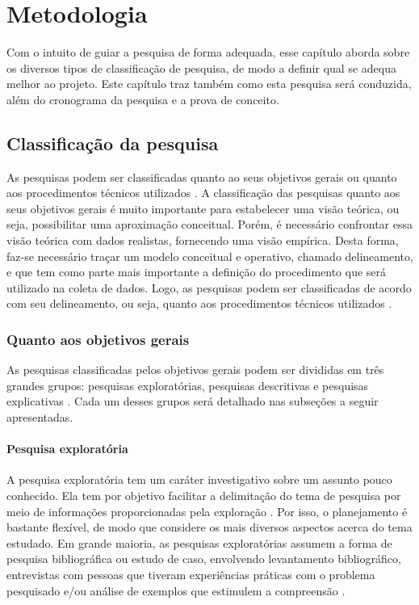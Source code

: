 \chapter{Metodologia}
Com o intuito de guiar a pesquisa de forma adequada, esse capítulo aborda sobre os diversos tipos de classificação de pesquisa, de modo a definir qual se adequa melhor ao projeto. Este capítulo traz também como esta pesquisa será conduzida, além do cronograma da pesquisa e a prova de conceito.

\section{Classificação da pesquisa}
	As pesquisas podem ser classificadas quanto ao seus objetivos gerais ou quanto aos procedimentos técnicos utilizados \cite{ac2002elaborar}. A classificação das pesquisas quanto aos seus objetivos gerais é muito importante para estabelecer uma visão teórica, ou seja, possibilitar uma aproximação conceitual. Porém, é necessário confrontar essa visão teórica com dados realistas, fornecendo uma visão empírica. Desta forma, faz-se necessário traçar um modelo conceitual e operativo, chamado delineamento, e que tem como parte mais importante a definição do procedimento que será utilizado na coleta de dados. Logo, as pesquisas podem ser classificadas de acordo com seu delineamento, ou seja, quanto aos procedimentos técnicos utilizados \cite{ac2002elaborar}.

\subsection{Quanto aos objetivos gerais}
	As pesquisas classificadas pelos objetivos gerais podem ser divididas em três grandes grupos: pesquisas exploratórias, pesquisas descritivas e pesquisas explicativas \cite{ac2002elaborar}. Cada um desses grupos será detalhado nas subseções a seguir apresentadas. 
\subsubsection{Pesquisa exploratória}
	A pesquisa exploratória tem um caráter investigativo sobre um assunto pouco conhecido. Ela tem por objetivo facilitar a delimitação do tema de pesquisa por meio de informações proporcionadas pela exploração \cite{prodanov2013metodologia}. Por isso, o planejamento é bastante flexível, de modo que considere os mais diversos aspectos acerca do tema estudado. Em grande maioria, as pesquisas exploratórias assumem a forma de pesquisa bibliográfica ou estudo de caso, envolvendo levantamento bibliográfico, entrevistas com pessoas que tiveram experiências práticas com o problema pesquisado e/ou análise de exemplos que estimulem a compreensão \cite{ac2002elaborar}.
